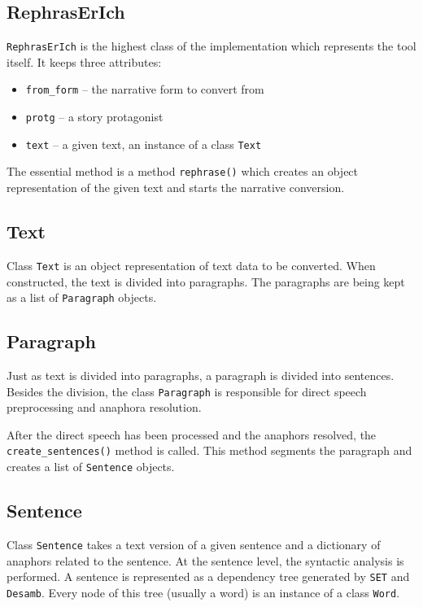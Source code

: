 \subsection{RephrasErIch}

\texttt{RephrasErIch} is the highest class of the implementation which represents the tool itself. It keeps three attributes:

\begin{itemize}
	\item \texttt{from\_form} -- the narrative form to convert from
	\item \texttt{protg} -- a story protagonist
	\item \texttt{text} -- a given text, an instance of a class \texttt{Text}
\end{itemize}

The essential method is a method \texttt{rephrase()} which creates an object representation of the given text and starts the narrative conversion.

\subsection{Text}

Class \texttt{Text} is an object representation of text data to be converted. When constructed, the text is divided into paragraphs. The paragraphs are being kept as a list of \texttt{Paragraph} objects.

\subsection{Paragraph}

Just as text is divided into paragraphs, a paragraph is divided into sentences. Besides the division, the class \texttt{Paragraph} is responsible for direct speech preprocessing and anaphora resolution.

After the direct speech has been processed and the anaphors resolved, the \texttt{create\_sentences()} method is called. This method segments the paragraph and creates a list of \texttt{Sentence} objects.

\subsection{Sentence}

Class \texttt{Sentence} takes a text version of a given sentence and a dictionary of anaphors related to the sentence. At the sentence level, the syntactic analysis is performed. A sentence is represented as a dependency tree generated by \texttt{SET} and \texttt{Desamb}. Every node of this tree (usually a word) is an instance of a class \texttt{Word}.

